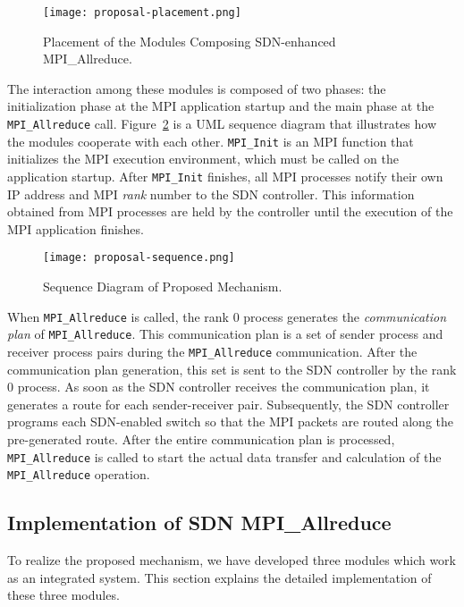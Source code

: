 \begin{figure}[htbp]
    \centering
    \texttt{[image: proposal-placement.png]}
    \caption{Placement of the Modules Composing SDN-enhanced MPI\_Allreduce.}%
    \label{fig-proposal-placement}
\end{figure}

The interaction among these modules is composed of two phases: the
initialization phase at the MPI application startup and the main phase
at the \texttt{MPI\_Allreduce} call. Figure~\ref{fig-proposal-sequence}
is a UML sequence diagram that illustrates how the modules cooperate
with each other. \texttt{MPI\_Init} is an MPI function that initializes
the MPI execution environment, which must be called on the application
startup. After \texttt{MPI\_Init} finishes, all MPI processes notify
their own IP address and MPI \emph{rank} number to the SDN controller.
This information obtained from MPI processes are held by the controller
until the execution of the MPI application finishes.

\begin{figure}[htbp]
    \centering
    \texttt{[image: proposal-sequence.png]}
    \caption{Sequence Diagram of Proposed Mechanism.}%
    \label{fig-proposal-sequence}
\end{figure}

When \texttt{MPI\_Allreduce} is called, the rank 0 process generates the
\emph{communication plan} of \texttt{MPI\_Allreduce}. This communication
plan is a set of sender process and receiver process pairs during the
\texttt{MPI\_Allreduce} communication. After the communication plan
generation, this set is sent to the SDN controller by the rank 0
process. As soon as the SDN controller receives the communication plan,
it generates a route for each sender-receiver pair. Subsequently, the
SDN controller programs each SDN-enabled switch so that the MPI packets
are routed along the pre-generated route. After the entire communication
plan is processed, \texttt{MPI\_Allreduce} is called to start the actual
data transfer and calculation of the \texttt{MPI\_Allreduce} operation.

\hypertarget{implementation-of-sdn-mpi_allreduce}{%
\subsection{Implementation of SDN
MPI\_Allreduce}\label{implementation-of-sdn-mpi_allreduce}}

To realize the proposed mechanism, we have developed three modules which
work as an integrated system. This section explains the detailed
implementation of these three modules.

